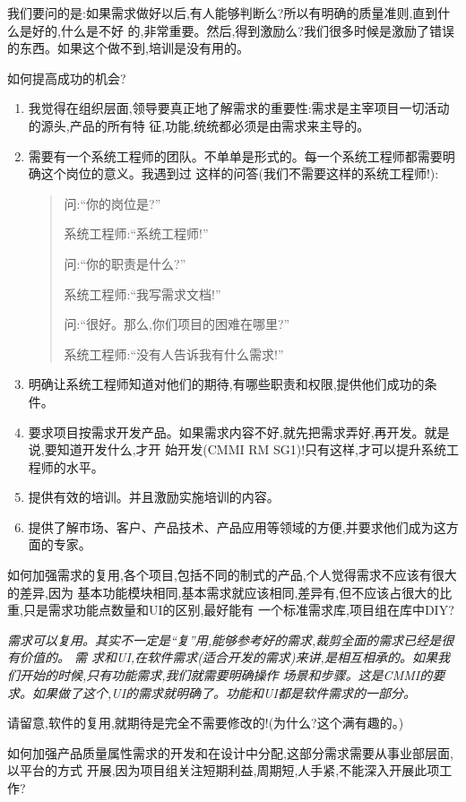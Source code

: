 \documentclass[11pt]{article}
\begin{document}
我们要问的是:如果需求做好以后,有人能够判断么?所以有明确的质量准则,直到什么是好的,什么是不好
的,非常重要。然后,得到激励么?我们很多时候是激励了错误的东西。如果这个做不到,培训是没有用的。

如何提高成功的机会?
\begin{enumerate}
\item 我觉得在组织层面,领导要真正地了解需求的重要性:需求是主宰项目一切活动的源头,产品的所有特
  征,功能,统统都必须是由需求来主导的。
\item 需要有一个系统工程师的团队。不单单是形式的。每一个系统工程师都需要明确这个岗位的意义。我遇到过
  这样的问答(我们不需要这样的系统工程师!):
  \begin{verse}
    问:``你的岗位是?''

    系统工程师:``系统工程师!''

    问:``你的职责是什么?''

    系统工程师:``我写需求文档!''

    问:``很好。那么,你们项目的困难在哪里?''

    系统工程师:``没有人告诉我有什么需求!''
  \end{verse}
\item 明确让系统工程师知道对他们的期待,有哪些职责和权限,提供他们成功的条件。
\item 要求项目按需求开发产品。如果需求内容不好,就先把需求弄好,再开发。就是说,要知道开发什么,才开
  始开发(CMMI RM SG1)!只有这样,才可以提升系统工程师的水平。
\item 提供有效的培训。并且激励实施培训的内容。
\item 提供了解市场、客户、产品技术、产品应用等领域的方便,并要求他们成为这方面的专家。
\end{enumerate}


\qlogo \rmfamily 如何加强需求的复用,各个项目,包括不同的制式的产品,个人觉得需求不应该有很大的差异,因为
基本功能模块相同,基本需求就应该相同,差异有,但不应该占很大的比重,只是需求功能点数量和UI的区别,最好能有
一个标准需求库,项目组在库中DIY?

\ylogo \itshape 需求可以复用。其实不一定是``复''用,能够参考好的需求,裁剪全面的需求已经是很有价值的。 需
求和UI,在软件需求(适合开发的需求)来讲,是相互相承的。如果我们开始的时候,只有功能需求,我们就需要明确操作
场景和步骤。这是CMMI的要求。如果做了这个,UI的需求就明确了。功能和UI都是软件需求的一部分。

请留意,软件的复用,就期待是完全不需要修改的!(为什么?这个满有趣的。)

\qlogo \rmfamily 如何加强产品质量属性需求的开发和在设计中分配,这部分需求需要从事业部层面,以平台的方式
开展,因为项目组关注短期利益,周期短,人手紧,不能深入开展此项工作?
\end{document}
